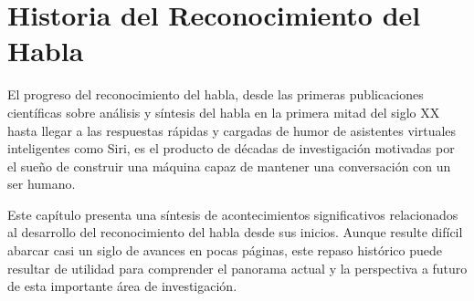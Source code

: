 \chapter{Historia del Reconocimiento del Habla}
\label{sec:antecedentes}

El progreso del reconocimiento del habla, desde las primeras publicaciones cient\'{i}ficas sobre
an\'{a}lisis y s\'{i}ntesis del habla en la primera mitad del siglo XX hasta llegar a las respuestas 
r\'{a}pidas y cargadas de humor de asistentes virtuales inteligentes como Siri, es el producto de d\'{e}cadas 
de investigaci\'{o}n motivadas por el sue\~{n}o de construir una m\'{a}quina capaz de mantener una 
conversaci\'{o}n con un ser humano.

Este cap\'{i}tulo presenta una s\'{i}ntesis de acontecimientos significativos relacionados al
desarrollo del reconocimiento del habla desde sus inicios. Aunque resulte dif\'{i}cil abarcar casi un siglo
de avances en pocas p\'{a}ginas, este repaso hist\'{o}rico puede resultar de utilidad para comprender el
panorama actual y la perspectiva a futuro de esta importante \'{a}rea de investigaci\'{o}n.







